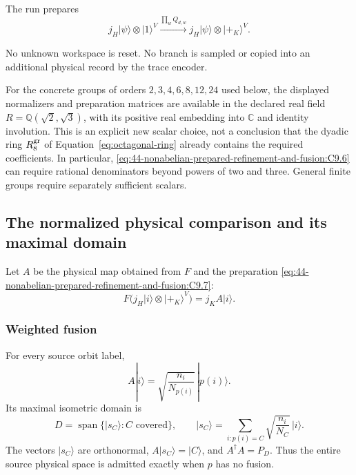 The run prepares
\begin{equation}
j_H|\psi\rangle\otimes|1\rangle^{V}
   \xrightarrow{\prod_w Q_{d,w}}
 j_H|\psi\rangle\otimes|+_K\rangle^V.
 \label{eq:44-nonabelian-prepared-refinement-and-fusion:C9.7}
\end{equation}

No unknown workspace is reset.  No branch is sampled or copied into an
additional physical record by the trace encoder.

For the concrete groups of orders $2,3,4,6,8,12,24$ used below, the displayed
normalizers and preparation matrices are available in the declared real field
$R=\mathbb Q(\sqrt2,\sqrt3)$, with its positive real embedding into $\mathbb C$
and identity involution.  This is an explicit new scalar choice, not a
conclusion that the dyadic ring $R^{\rm gr}_8$ of
Equation~\eqref{eq:octagonal-ring} already contains the required coefficients.
In particular, \eqref{eq:44-nonabelian-prepared-refinement-and-fusion:C9.6} can
require rational denominators beyond powers of two and three.  General finite
groups require separately sufficient scalars.

\subsection{The normalized physical comparison and its maximal domain}\label{md:44-nonabelian-prepared-refinement-and-fusion:the-normalized-physical-comparison-and-its-maximal-domain}

Let $A$ be the physical map obtained from $F$ and the preparation
\eqref{eq:44-nonabelian-prepared-refinement-and-fusion:C9.7}:
\begin{equation}
F\bigl(j_H|i\rangle\otimes|+_K\rangle^V\bigr)
   =j_K A|i\rangle.
 \label{eq:44-nonabelian-prepared-refinement-and-fusion:C9.8}
\end{equation}

\subsubsection{Weighted fusion}\label{md:44-nonabelian-prepared-refinement-and-fusion:weighted-fusion}

\begin{proposition}\label{prop:weighted-fusion}
For every source orbit label,
\begin{equation}
A|i\rangle=\sqrt{\frac{n_i}{N_{p(i)}}}\,|p(i)\rangle.
 \label{eq:44-nonabelian-prepared-refinement-and-fusion:C9.9}
\end{equation}
Its maximal isometric domain is
\begin{equation}
D=\operatorname{span}\{|s_C\rangle:C\text{ covered}\},\qquad
 |s_C\rangle=\sum_{i:p(i)=C}\sqrt{\frac{n_i}{N_C}}\,|i\rangle.
 \label{eq:44-nonabelian-prepared-refinement-and-fusion:C9.10}
\end{equation}
The vectors $|s_C\rangle$ are orthonormal, $A|s_C\rangle=|C\rangle$, and
$A^\dagger A=P_D$.  Thus the entire source physical space is admitted exactly
when $p$ has no fusion.
\end{proposition}

